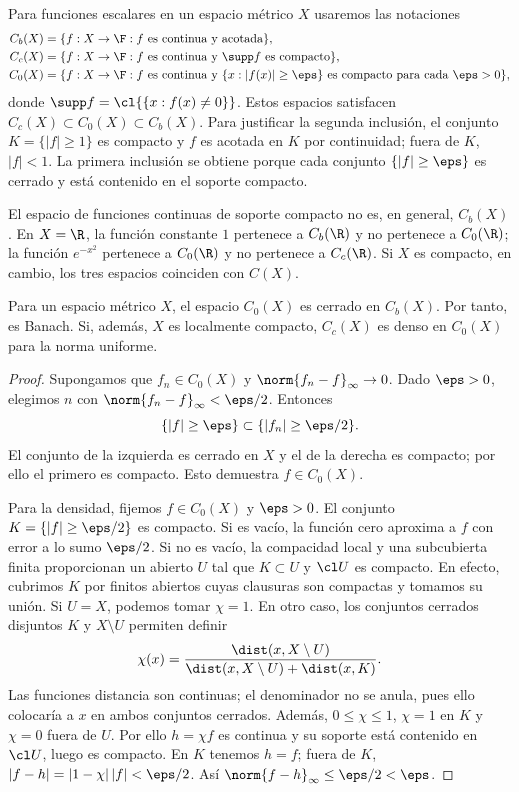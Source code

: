 Para funciones escalares en un espacio métrico $X$ usaremos las notaciones
\[
 \begin{split}
 C_b(X)&=\{f:X\to\F:f\text{ es continua y acotada}\},\\
 C_c(X)&=\{f:X\to\F:f\text{ es continua y }\supp f\text{ es compacto}\},\\
 C_0(X)&=\{f:X\to\F:f\text{ es continua y }
 \{x:|f(x)|\ge\eps\}\text{ es compacto para cada }\eps>0\},
 \end{split}
\]
donde $\supp f=\cl{\{x:f(x)\ne0\}}$. Estos espacios satisfacen $C_c(X)\subset C_0(X)\subset C_b(X)$. Para justificar la segunda inclusión, el conjunto $K=\{|f|\ge1\}$ es compacto y $f$ es acotada en $K$ por continuidad; fuera de $K$, $|f|<1$. La primera inclusión se obtiene porque cada conjunto $\{|f|\ge\eps\}$ es cerrado y está contenido en el soporte compacto.

\begin{observacion}
El espacio de funciones continuas de soporte compacto no es, en general, $C_b(X)$. En $X=\R$, la función constante $1$ pertenece a $C_b(\R)$ y no pertenece a $C_0(\R)$; la función $e^{-x^2}$ pertenece a $C_0(\R)$ y no pertenece a $C_c(\R)$. Si $X$ es compacto, en cambio, los tres espacios coinciden con $C(X)$.
\end{observacion}

\begin{proposicion}
Para un espacio métrico $X$, el espacio $C_0(X)$ es cerrado en $C_b(X)$. Por tanto, es Banach. Si, además, $X$ es localmente compacto, $C_c(X)$ es denso en $C_0(X)$ para la norma uniforme.
\end{proposicion}
\begin{proof}
Supongamos que $f_n\in C_0(X)$ y $\norm{f_n-f}_\infty\to0$. Dado $\eps>0$, elegimos $n$ con $\norm{f_n-f}_\infty<\eps/2$. Entonces
\[
 \{|f|\ge\eps\}\subset\{|f_n|\ge\eps/2\}.
\]
El conjunto de la izquierda es cerrado en $X$ y el de la derecha es compacto; por ello el primero es compacto. Esto demuestra $f\in C_0(X)$.

Para la densidad, fijemos $f\in C_0(X)$ y $\eps>0$. El conjunto $K=\{|f|\ge\eps/2\}$ es compacto. Si es vacío, la función cero aproxima a $f$ con error a lo sumo $\eps/2$. Si no es vacío, la compacidad local y una subcubierta finita proporcionan un abierto $U$ tal que $K\subset U$ y $\cl U$ es compacto. En efecto, cubrimos $K$ por finitos abiertos cuyas clausuras son compactas y tomamos su unión. Si $U=X$, podemos tomar $\chi=1$. En otro caso, los conjuntos cerrados disjuntos $K$ y $X\setminus U$ permiten definir
\[
 \chi(x)=\frac{\dist(x,X\setminus U)}{\dist(x,X\setminus U)+\dist(x,K)}.
\]
Las funciones distancia son continuas; el denominador no se anula, pues ello colocaría a $x$ en ambos conjuntos cerrados. Además, $0\le\chi\le1$, $\chi=1$ en $K$ y $\chi=0$ fuera de $U$. Por ello $h=\chi f$ es continua y su soporte está contenido en $\cl U$, luego es compacto. En $K$ tenemos $h=f$; fuera de $K$,
$|f-h|=|1-\chi|\,|f|<\eps/2$. Así $\norm{f-h}_\infty\le\eps/2<\eps$.
\end{proof}

